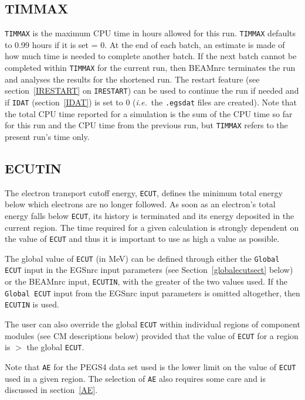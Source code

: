\documentclass[12pt,twoside]{article}
\newcommand{\ie}{{\em i.e.}}
\begin{document}
\subsection{TIMMAX}

\verb+TIMMAX+ is the maximum CPU time in hours allowed for this run.
\verb+TIMMAX+ defaults to 0.99 hours if it is set = 0.
At the end of each batch, an estimate is made of how much time is needed
to complete another batch. If the next batch cannot be completed within
\verb+TIMMAX+ for the current run, then BEAMnrc terminates the run and
analyses the results for the shortened run.  The restart feature (see
section~\ref{IRESTART} on \verb+IRESTART+) can be used to continue the
run if needed and if \verb+IDAT+ (section~\ref{IDAT}) is set to 0 (\ie\ the
{\tt .egsdat} files are created).
Note that the total CPU time
reported for a simulation is the sum of the CPU time so far for this run and
the CPU time from the previous run, but \verb+TIMMAX+ refers to the
present run's time only.

\subsection{ ECUTIN}
\label{ECUTIN}

The electron transport cutoff energy, {\tt ECUT}, defines the minimum
total energy below which electrons are no longer followed.  As soon
as an electron's total energy falls below {\tt ECUT}, its
history is terminated and its energy deposited in the current region.
The time required for a given calculation is strongly dependent on the
value of \verb+ECUT+ and thus it is important to use as high a value
as possible.

The global value of {\tt ECUT} (in MeV) can be defined through either the
{\tt Global ECUT} input in the EGSnrc input parameters
(see Section~\ref{globalecutsect} below) or the BEAMnrc input, {\tt ECUTIN}, with
the greater of the two values used.  If
the {\tt Global ECUT} input from the EGSnrc input parameters is omitted
altogether, then {\tt ECUTIN} is used.

The user can also override the global {\tt ECUT} within individual regions
of component modules (see CM descriptions below) provided that
the value of \verb+ECUT+ for a region is $>$
the global \verb+ECUT+.

Note that \verb+AE+ for the PEGS4 data set used is the lower limit on the
value of \verb+ECUT+ used in a given region.  The selection of \verb+AE+
also requires some care and is discussed in section~\ref{AE}.  
\end{document}
